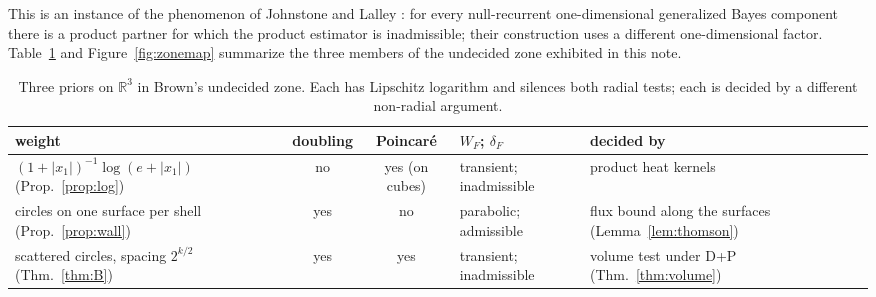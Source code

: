 \documentclass[11pt]{amsart}
\newcommand{\R}{\mathbb{R}}
\newcommand{\abs}[1]{\lvert #1\rvert}
\theoremstyle{plain}
\theoremstyle{definition}
\theoremstyle{remark}
\begin{document}
This is an instance of the phenomenon of Johnstone and Lalley
\cite[Thm.~1.1]{johnstonelalley1984}: for every null-recurrent one-dimensional
generalized Bayes component there is a product partner for which the product
estimator is inadmissible; their construction uses a different one-dimensional
factor. Table~\ref{tab:zone} and Figure~\ref{fig:zonemap} summarize the three members
of the undecided zone exhibited in this note.

\begin{table}[t]
\caption{Three priors on $\R^3$ in Brown's undecided zone. Each has Lipschitz
logarithm and silences both radial tests; each is decided by a different
non-radial argument.}
\label{tab:zone}
\small
\begin{tabular}{@{}>{\raggedright\arraybackslash}p{}cc>{\raggedright\arraybackslash}p{}>{\raggedright\arraybackslash}p{}@{}}
\toprule
weight & doubling & Poincar\'e & $W_F$; $\delta_F$ & decided by \\
\midrule
$(1+\abs{x_1})^{-1}\log(e+\abs{x_1})$ (Prop.~\ref{prop:log}) & no & yes (on cubes) & transient; inadmissible & product heat kernels \\
circles on one surface per shell (Prop.~\ref{prop:wall}) & yes & no & parabolic; admissible & flux bound along the surfaces (Lemma~\ref{lem:thomson}) \\
scattered circles, spacing $2^{k/2}$ (Thm.~\ref{thm:B}) & yes & yes & transient; inadmissible & volume test under D+P (Thm.~\ref{thm:volume}) \\
\bottomrule
\end{tabular}
\end{table}
\end{document}
